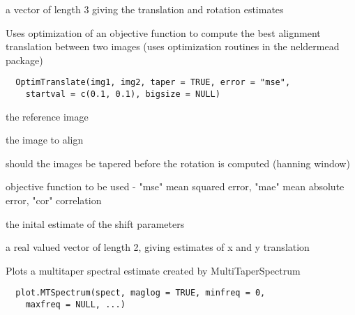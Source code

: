 \documentclass[a4paper]{book}
\begin{document}
%
\begin{Value}
a vector of length 3 giving the translation and rotation
estimates
\end{Value}
%
\begin{Description}\relax
Uses optimization of an objective function to compute the
best alignment translation between two images (uses
optimization routines in the neldermead package)
\end{Description}
%
\begin{Usage}
\begin{verbatim}
  OptimTranslate(img1, img2, taper = TRUE, error = "mse",
    startval = c(0.1, 0.1), bigsize = NULL)
\end{verbatim}
\end{Usage}
%
\begin{Arguments}
\begin{ldescription}
\item[\code{img1}] the reference image

\item[\code{img2}] the image to align

\item[\code{taper}] should the images be tapered before the
rotation is computed (hanning window)

\item[\code{error}] objective function to be used - "mse" mean
squared error, "mae" mean absolute error, "cor"
correlation

\item[\code{startval}] the inital estimate of the shift
parameters
\end{ldescription}
\end{Arguments}
%
\begin{Value}
a real valued vector of length 2, giving estimates of x
and y translation
\end{Value}
%
\begin{Description}\relax
Plots a multitaper spectral estimate created by
MultiTaperSpectrum
\end{Description}
%
\begin{Usage}
\begin{verbatim}
  plot.MTSpectrum(spect, maglog = TRUE, minfreq = 0,
    maxfreq = NULL, ...)
\end{verbatim}
\end{Usage}
\end{document}

